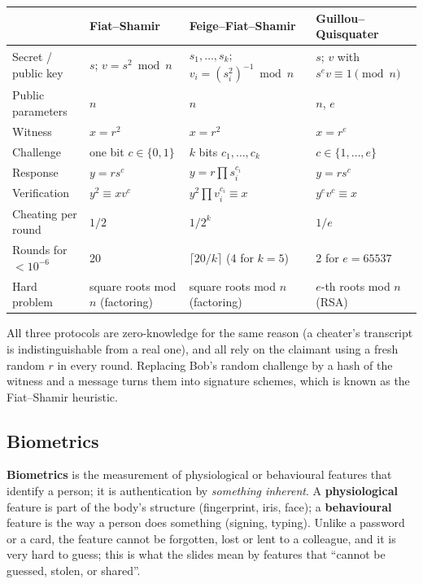\begin{center}\small
\begin{tabularx}{\textwidth}{@{}l X X X@{}}
\toprule
 & Fiat--Shamir & Feige--Fiat--Shamir & Guillou--Quisquater\\
\midrule
Secret / public key & $s$; \;$v = s^2 \bmod n$ & $s_1, \dots, s_k$; \;$v_i = (s_i^2)^{-1} \bmod n$ & $s$; \;$v$ with $s^e v \equiv 1 \pmod n$\\
Public parameters & $n$ & $n$ & $n$, $e$\\
Witness & $x = r^2$ & $x = r^2$ & $x = r^e$\\
Challenge & one bit $c \in \{0, 1\}$ & $k$ bits $c_1, \dots, c_k$ & $c \in \{1, \dots, e\}$\\
Response & $y = r s^c$ & $y = r \prod s_i^{c_i}$ & $y = r s^c$\\
Verification & $y^2 \equiv x v^c$ & $y^2 \prod v_i^{c_i} \equiv x$ & $y^e v^c \equiv x$\\
Cheating per round & $1/2$ & $1/2^k$ & $1/e$\\
Rounds for $< 10^{-6}$ & 20 & $\lceil 20/k \rceil$ (4 for $k = 5$) & 2 for $e = 65537$\\
Hard problem & square roots mod $n$ (factoring) & square roots mod $n$ (factoring) & $e$-th roots mod $n$ (RSA)\\
\bottomrule
\end{tabularx}
\end{center}
All three protocols are zero-knowledge for the same reason (a cheater's transcript is indistinguishable from a real one), and all rely on the claimant using a fresh random $r$ in every round. Replacing Bob's random challenge by a hash of the witness and a message turns them into signature schemes, which is known as the Fiat--Shamir heuristic.

\subsection{Biometrics \new}

\textbf{Biometrics} is the measurement of physiological or behavioural features that identify a person; it is authentication by \emph{something inherent}. A \textbf{physiological} feature is part of the body's structure (fingerprint, iris, face); a \textbf{behavioural} feature is the way a person does something (signing, typing). Unlike a password or a card, the feature cannot be forgotten, lost or lent to a colleague, and it is very hard to guess; this is what the slides mean by features that ``cannot be guessed, stolen, or shared''.

